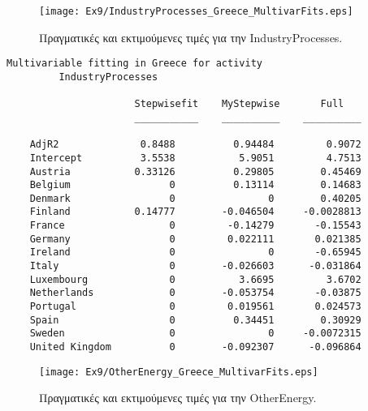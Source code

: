 \documentclass[11pt]{scrartcl} %
\begin{document}
\begin{figure}[H]

	\centering
	\texttt{[image: Ex9/IndustryProcesses\_Greece\_MultivarFits.eps]}	
\caption{Πραγματικές και εκτιμούμενες τιμές για την IndustryProcesses.}
\label{fig:z96} 
\end{figure}



\begin{Verbatim}[fontsize=\small]
Multivariable fitting in Greece for activity
 	 	 IndustryProcesses

                      Stepwisefit    MyStepwise       Full   
                      ___________    __________    __________

    AdjR2              0.8488          0.94484         0.9072
    Intercept          3.5538           5.9051         4.7513
    Austria           0.33126          0.29805        0.45469
    Belgium                 0          0.13114        0.14683
    Denmark                 0                0        0.40205
    Finland           0.14777        -0.046504     -0.0028813
    France                  0         -0.14279       -0.15543
    Germany                 0         0.022111       0.021385
    Ireland                 0                0       -0.65945
    Italy                   0        -0.026603      -0.031864
    Luxembourg              0           3.6695         3.6702
    Netherlands             0        -0.053754       -0.03875
    Portugal                0         0.019561       0.024573
    Spain                   0          0.34451        0.30929
    Sweden                  0                0     -0.0072315
    United Kingdom          0        -0.092307      -0.096864
\end{Verbatim}


\begin{figure}[H]
 
	\centering
	\texttt{[image: Ex9/OtherEnergy\_Greece\_MultivarFits.eps]}	
\caption{Πραγματικές και εκτιμούμενες τιμές για την OtherEnergy.}
\label{fig:z97}
\end{figure}
\end{document}
